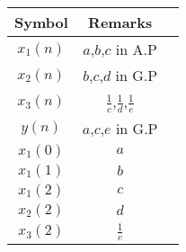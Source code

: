 \begin{tabular}{|c|c|c|}
    \hline
     \textbf{Symbol} & \textbf{Remarks} \\
    \hline
     $x_1(n)$ &  $a$,$b$,$c$ in A.P\\[6pt]
    \hline 
     $x_2(n)$ &  $b$,$c$,$d$ in G.P\\[6pt]
    \hline
     $x_3(n)$ &  $\frac{1}{c}$,$\frac{1}{d}$,$\frac{1}{e}$\\[6pt]
    \hline
     $y(n)$   &  $a$,$c$,$e$ in G.P\\[6pt]
    \hline
     $x_1(0)$ &  $a$\\[6pt]
    \hline
     $x_1(1)$ &  $b$\\[6pt]
    \hline
     $x_1(2)$ &  $c$\\[6pt]
    \hline
     $x_2(2)$ &  $d$\\[6pt]
    \hline
     $x_3(2)$ &  $\frac{1}{e}$\\[6pt]
    \hline
\end{tabular}

